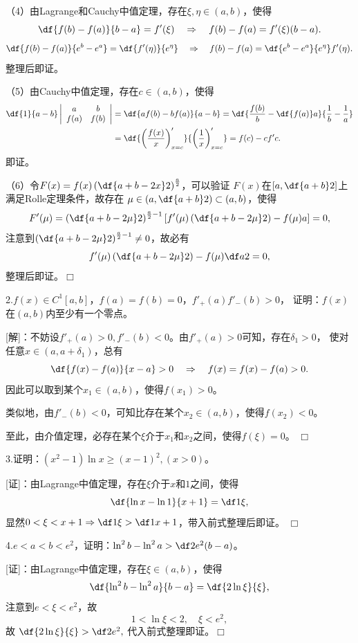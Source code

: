 （4）由Lagrange和Cauchy中值定理，存在$\xi,\eta\in(a,b)$，使得
$$\df{f(b)-f(a)}{b-a}=f'(\xi)
\quad\Rightarrow\quad
f(b)-f(a)=f'(\xi)(b-a).$$
$$\df{f(b)-f(a)}{e^b-e^a}=\df{f'(\eta)}{e^{\eta}}
\quad\Rightarrow\quad
f(b)-f(a)=\df{e^b-e^a}{e^{\eta}}f'(\eta).$$
整理后即证。

（5）由Cauchy中值定理，存在$c\in(a,b)$，使得
\begin{align*}
	\df{1}{a-b}\left|\begin{array}{cc}
	a & b\\ f(a) & f(b)
	\end{array}\right|
	&=\df{af(b)-bf(a)}{a-b}=\df{\frac{f(b)}b-\df{f(a)}a}{\frac1b-\frac1a}\\
	&=\df{\left(\frac{f(x)}x\right)'_{x=c}}{\left(\frac1x\right)'_{x=c}}
	=f(c)-cf'c.
\end{align*}
即证。

（6）令$F(x)=f(x)\left(\df{a+b-2x}2\right)^{\frac a2}$，可以验证
$F(x)$在$\left[a,\df{a+b}2\right]$上满足Rolle定理条件，故存在
$\mu\in\left(a,\df{a+b}2\right)\subset(a,b)$，使得
$$F'(\mu)=\left(\df{a+b-2\mu}2\right)^{\frac a2-1}
\left[f'(\mu)\left(\df{a+b-2\mu}2\right)
-f(\mu)a\right]=0,$$
注意到$\left(\df{a+b-2\mu}2\right)^{\frac a2-1}\ne0$，故必有
$$f'(\mu)\left(\df{a+b-2\mu}2\right)-f(\mu)\df a2=0,$$
整理后即证。\hfill$\Box$

\bigskip

2.$f(x)\in C^1[a,b]$，$f(a)=f(b)=0$，$f'_+(a)f'_-(b)>0$，
证明：$f(x)$在$(a,b)$内至少有一个零点。

[解]：不妨设$f'_+(a)>0,f'_-(b)<0$。由$f'_+(a)>0$可知，存在$\delta_1>0$，
使对任意$x\in(a,a+\delta_1)$，总有
$$\df{f(x)-f(a)}{x-a}>0\quad\Rightarrow
\quad f(x)=f(x)-f(a)>0.$$
因此可以取到某个$x_1\in(a,b)$，使得$f(x_1)>0$。

类似地，由$f'_-(b)<0$，可知比存在某个$x_2\in(a,b)$，使得$f(x_2)<0$。

至此，由介值定理，必存在某个$\xi$介于$x_1$和$x_2$之间，使得$f(\xi)=0$。
\hfill$\Box$

\bigskip

3.证明：$(x^2-1)\ln x\geq(x-1)^2,(x>0)$。

[证]：由Lagrange中值定理，存在$\xi$介于$x$和$1$之间，使得
$$\df{\ln x-\ln 1}{x+1}=\df1{\xi},$$
显然$0<\xi<x+1\Rightarrow\df1{\xi}>\df1{x+1}$，带入前式整理后即证。
\hfill$\Box$

\bigskip

4.$e<a<b<e^2$，证明：$\ln^2b-\ln^2a>\df2{e^2}(b-a)$。

[证]：由Lagrange中值定理，存在$\xi\in(a,b)$，使得
$$\df{\ln^2b-\ln^2a}{b-a}=\df{2\ln\xi}{\xi},$$
注意到$e<\xi<e^2$，故
$$1<\ln\xi<2,\quad \xi<e^2,$$
故
$\df{2\ln\xi}{\xi}>\df2{e^2},$
代入前式整理即证。\hfill$\Box$

